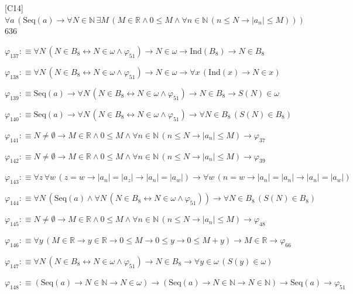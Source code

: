 \begin{fullproof}{[C14]}{$\forall a\,(\mathrm{Seq}(a) \to \forall N \in \mathbb{N}\,\exists M\,(M \in \mathbb{R} \land 0 \leq M \land \forall n \in \mathbb{N}\,(n \leq N \to \lvert a_{n} \rvert \leq M)))$}{636}
\begin{abbrevlist}
\item $\varphi_{137} :\equiv \forall N\,(N \in B_{8} \leftrightarrow N \in \omega \land \varphi_{51}) \to N \in \omega \to \mathrm{Ind}(B_{8}) \to N \in B_{8}$
\item $\varphi_{138} :\equiv \forall N\,(N \in B_{8} \leftrightarrow N \in \omega \land \varphi_{51}) \to N \in \omega \to \forall x\,(\mathrm{Ind}(x) \to N \in x)$
\item $\varphi_{139} :\equiv \mathrm{Seq}(a) \to \forall N\,(N \in B_{8} \leftrightarrow N \in \omega \land \varphi_{51}) \to N \in B_{8} \to S(N) \in \omega$
\item $\varphi_{140} :\equiv \mathrm{Seq}(a) \to \forall N\,(N \in B_{8} \leftrightarrow N \in \omega \land \varphi_{51}) \to \forall N \in B_{8}\,(S(N) \in B_{8})$
\item $\varphi_{141} :\equiv N \neq \emptyset \to M \in \mathbb{R} \land 0 \leq M \land \forall n \in \mathbb{N}\,(n \leq N \to \lvert a_{n} \rvert \leq M) \to \varphi_{37}$
\item $\varphi_{142} :\equiv N \neq \emptyset \to M \in \mathbb{R} \land 0 \leq M \land \forall n \in \mathbb{N}\,(n \leq N \to \lvert a_{n} \rvert \leq M) \to \varphi_{39}$
\item $\varphi_{143} :\equiv \forall z\,\forall w\,(z = w \to \lvert a_{n} \rvert = \lvert a_{z} \rvert \to \lvert a_{n} \rvert = \lvert a_{w} \rvert) \to \forall w\,(n = w \to \lvert a_{n} \rvert = \lvert a_{n} \rvert \to \lvert a_{n} \rvert = \lvert a_{w} \rvert)$
\item $\varphi_{144} :\equiv \forall N\,(\mathrm{Seq}(a) \land \forall N\,(N \in B_{8} \leftrightarrow N \in \omega \land \varphi_{51})) \to \forall N \in B_{8}\,(S(N) \in B_{8})$
\item $\varphi_{145} :\equiv N \neq \emptyset \to M \in \mathbb{R} \land 0 \leq M \land \forall n \in \mathbb{N}\,(n \leq N \to \lvert a_{n} \rvert \leq M) \to \varphi_{48}$
\item $\varphi_{146} :\equiv \forall y\,(M \in \mathbb{R} \to y \in \mathbb{R} \to 0 \leq M \to 0 \leq y \to 0 \leq M + y) \to M \in \mathbb{R} \to \varphi_{66}$
\item $\varphi_{147} :\equiv \forall N\,(N \in B_{8} \leftrightarrow N \in \omega \land \varphi_{51}) \to N \in B_{8} \to \forall y \in \omega\,(S(y) \in \omega)$
\item $\varphi_{148} :\equiv (\mathrm{Seq}(a) \to N \in \mathbb{N} \to N \in \omega) \to (\mathrm{Seq}(a) \to N \in \mathbb{N} \to N \in \mathbb{N}) \to \mathrm{Seq}(a) \to \varphi_{51}$

\end{abbrevlist}
\end{fullproof}
